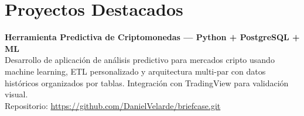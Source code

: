 \documentclass[a4paper,10pt]{article}
\begin{document}
\vspace{10pt}

\section*{Proyectos Destacados}
\textbf{Herramienta Predictiva de Criptomonedas — Python + PostgreSQL + ML} \\
Desarrollo de aplicación de análisis predictivo para mercados cripto usando machine learning, ETL personalizado y arquitectura multi-par con datos históricos organizados por tablas. Integración con TradingView para validación visual. \\
Repositorio: \url{https://github.com/DanielVelarde/briefcase.git}
\end{document}
